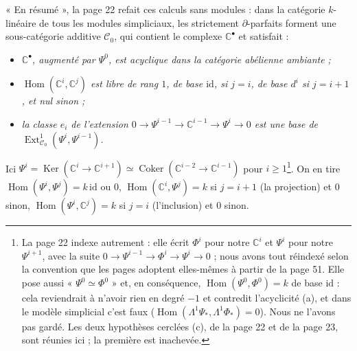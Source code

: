 \documentclass[11pt,a4paper]{article}
\begin{document}
« En résumé », la page 22 refait ces calculs sans modules : dans la catégorie
$k$-linéaire de tous les modules simpliciaux, les strictement
$\partial$-parfaits forment une sous-catégorie additive $\mathcal{C}_{0}$,
qui contient le complexe $\mathbb{C}^{\bullet}$ et satisfait :
\begin{itemize}
\item[(a)] \emph{$\mathbb{C}^{\bullet}$, augmenté par $\Psi^{0}$, est
acyclique dans la catégorie abélienne ambiante ;}
\item[(b)] \emph{$\operatorname{Hom}(\mathbb{C}^{i}, \mathbb{C}^{j})$ est
libre de rang $1$, de base $\mathrm{id}$, si $j = i$, de base $d^{i}$ si
$j = i+1$, et nul sinon ;}
\item[(c)] \emph{la classe $e_{i}$ de l'extension
$0 \to \Psi^{i-1} \to \mathbb{C}^{i-1} \to \Psi^{i} \to 0$ est une base de
$\operatorname{Ext}^{1}_{\mathcal{C}_{0}}(\Psi^{i}, \Psi^{i-1})$.}
\end{itemize}
Ici $\Psi^{i} = \operatorname{Ker}(\mathbb{C}^{i} \to \mathbb{C}^{i+1})
\simeq \operatorname{Coker}(\mathbb{C}^{i-2} \to \mathbb{C}^{i-1})$ pour
$i \geqslant 1$\footnote{La page 22 indexe autrement : elle écrit $\Phi^{i}$
pour notre $\mathbb{C}^{i}$ et $\Psi^{i}$ pour notre $\Psi^{i+1}$, avec la
suite $0 \to \Psi^{i-1} \to \Phi^{i} \to \Psi^{i} \to 0$ ; nous avons tout
réindexé selon la convention que les pages adoptent elles-mêmes à partir de
la page 51. Elle pose aussi « $\Psi^{0} \simeq \Phi^{0}$ » et, en conséquence,
$\operatorname{Hom}(\Psi^{0}, \Phi^{0}) = k$ de base $\mathrm{id}$ : cela
reviendrait à n'avoir rien en degré $-1$ et contredit l'acyclicité (a), et
dans le modèle simplicial c'est faux ($\operatorname{Hom}(\Lambda^{1}\Psi_{*},
\Lambda^{1}\Phi_{*}) = 0$). Nous ne l'avons pas gardé. Les deux hypothèses
cerclées (c), de la page 22 et de la page 23, sont réunies ici ; la
première est inachevée.}. On en tire $\operatorname{Hom}(\Psi^{i},
\Psi^{j}) = k\,\mathrm{id}$ ou $0$, $\operatorname{Hom}(\mathbb{C}^{i},
\Psi^{j}) = k$ si $j = i+1$ (la projection) et $0$ sinon,
$\operatorname{Hom}(\Psi^{i}, \mathbb{C}^{j}) = k$ si $j = i$ (l'inclusion)
et $0$ sinon.
\end{document}

